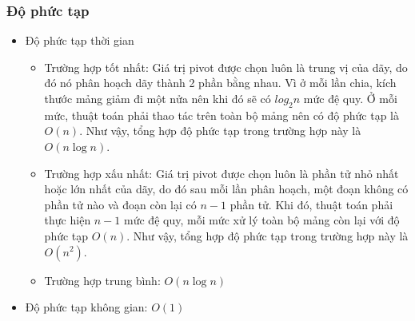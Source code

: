
\subsubsection{Độ phức tạp}

\begin{itemize}
    \item Độ phức tạp thời gian \cite[p.~209--212]{cormen2022}
    \begin{itemize}[label=$\circ$]
        \item Trường hợp tốt nhất: Giá trị pivot được chọn luôn là trung vị của dãy, do đó nó phân hoạch dãy thành 2 phần bằng nhau. Vì ở mỗi lần chia, kích thước mảng giảm đi một nửa nên khi đó sẽ có $log_2{n}$ mức đệ quy. Ở mỗi mức, thuật toán phải thao tác trên toàn bộ mảng nên có độ phức tạp là $O\left(n\right)$. Như vậy, tổng hợp độ phức tạp trong trường hợp này là $O\left(n\log{n}\right)$.
        
		\pagebreak

        \item Trường hợp xấu nhất: Giá trị pivot được chọn luôn là phần tử nhỏ nhất hoặc lớn nhất của dãy, do đó sau mỗi lần phân hoạch, một đoạn không có phần tử nào và đoạn còn lại có $n - 1$ phần tử. Khi đó, thuật toán phải thực hiện  $n - 1$ mức đệ quy, mỗi mức xử lý toàn bộ mảng còn lại với độ phức tạp $O\left(n\right)$. Như vậy, tổng hợp độ phức tạp trong trường hợp này là $O\left(n^2\right)$.
        
        \item Trường hợp trung bình: $O\left(n\log{n}\right)$ 
    \end{itemize}
    
    \item Độ phức tạp không gian: $O\left(1\right)$
\end{itemize}